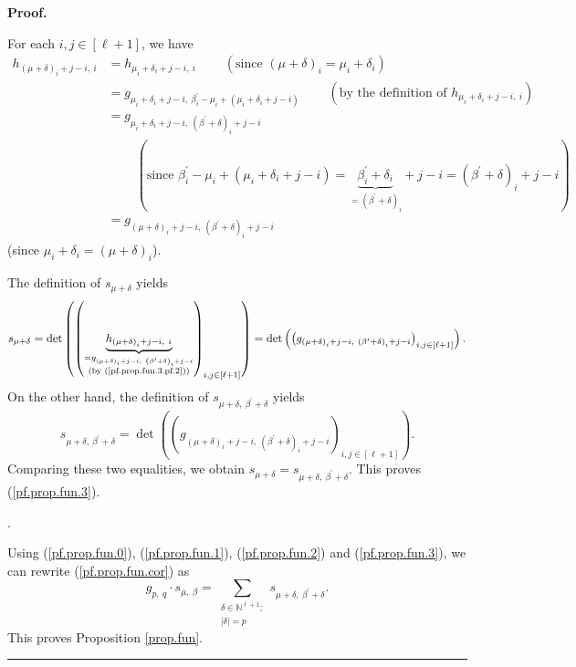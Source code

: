 \documentclass[numbers=enddot,12pt,final,onecolumn,notitlepage,english]{scrartcl}%
\theoremstyle{definition}
\newenvironment{proof}[1][Proof]{\noindent\textbf{#1.} }{\ \rule{0.5em}{0.5em}}
\let\sumnonlimits\sum
\renewcommand{\sum}{\sumnonlimits\limits}
\newenvironment{verlong}{}{}
\begin{document}
\begin{verlong}
\begin{proof}
{For each $i,j\in\left[  \ell+1\right]  $, we have%
\begin{align}
h_{\left(  \mu+\delta\right)  _{i}+j-i,\ i}  &  =h_{\mu_{i}+\delta
_{i}+j-i,\ i}\ \ \ \ \ \ \ \ \ \ \left(  \text{since }\left(  \mu
+\delta\right)  _{i}=\mu_{i}+\delta_{i}\right) \nonumber\\
&  =g_{\mu_{i}+\delta_{i}+j-i,\ \beta_{i}^{\prime}-\mu_{i}+\left(  \mu
_{i}+\delta_{i}+j-i\right)  }\ \ \ \ \ \ \ \ \ \ \left(  \text{by the
definition of }h_{\mu_{i}+\delta_{i}+j-i,\ i}\right) \nonumber\\
&  =g_{\mu_{i}+\delta_{i}+j-i,\ \left(  \beta^{\prime}+\delta\right)
_{i}+j-i}\nonumber\\
&  \ \ \ \ \ \ \ \ \ \ \left(  \text{since }\beta_{i}^{\prime}-\mu_{i}+\left(
\mu_{i}+\delta_{i}+j-i\right)  =\underbrace{\beta_{i}^{\prime}+\delta_{i}%
}_{=\left(  \beta^{\prime}+\delta\right)  _{i}}+j-i=\left(  \beta^{\prime
}+\delta\right)  _{i}+j-i\right) \nonumber\\
&  =g_{\left(  \mu+\delta\right)  _{i}+j-i,\ \left(  \beta^{\prime}%
+\delta\right)  _{i}+j-i} \label{pf.prop.fun.3.pf.2}%
\end{align}
(since $\mu_{i}+\delta_{i}=\left(  \mu+\delta\right)  _{i}$).
\par
The definition of $s_{\mu+\delta}$ yields%
\[
s_{\mu+\delta}=\det\left(  \left(  \underbrace{h_{\left(  \mu+\delta\right)
_{i}+j-i,\ i}}_{\substack{=g_{\left(  \mu+\delta\right)  _{i}+j-i,\ \left(
\beta^{\prime}+\delta\right)  _{i}+j-i}\\\text{(by (\ref{pf.prop.fun.3.pf.2}%
))}}}\right)  _{i,j\in\left[  \ell+1\right]  }\right)  =\det\left(  \left(
g_{\left(  \mu+\delta\right)  _{i}+j-i,\ \left(  \beta^{\prime}+\delta\right)
_{i}+j-i}\right)  _{i,j\in\left[  \ell+1\right]  }\right)  .
\]
On the other hand, the definition of $s_{\mu+\delta,\ \beta^{\prime}+\delta}$
yields%
\[
s_{\mu+\delta,\ \beta^{\prime}+\delta}=\det\left(  \left(  g_{\left(
\mu+\delta\right)  _{i}+j-i,\ \left(  \beta^{\prime}+\delta\right)  _{i}%
+j-i}\right)  _{i,j\in\left[  \ell+1\right]  }\right)  .
\]
Comparing these two equalities, we obtain $s_{\mu+\delta}=s_{\mu
+\delta,\ \beta^{\prime}+\delta}$. This proves (\ref{pf.prop.fun.3}).}.

Using (\ref{pf.prop.fun.0}), (\ref{pf.prop.fun.1}), (\ref{pf.prop.fun.2}) and
(\ref{pf.prop.fun.3}), we can rewrite (\ref{pf.prop.fun.cor}) as%
\[
g_{p,\ q}\cdot s_{\overline{\mu},\ \beta}=\sum_{\substack{\delta\in
\mathbb{N}^{\ell+1};\\\left\vert \delta\right\vert =p}}s_{\mu+\delta
,\ \beta^{\prime}+\delta}.
\]
This proves Proposition \ref{prop.fun}.
\end{proof}
\end{verlong}
\end{document}
